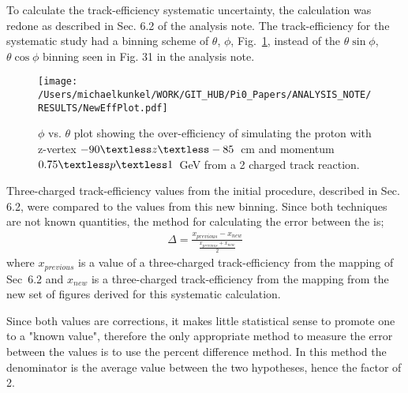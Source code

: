 \documentclass[10pt,a4paper]{report}
\author{Michael C. Kunkel}
\newlength{\figwidth}
\newlength{\hfigheight}
\begin{document}
	To calculate the track-efficiency systematic uncertainty, the calculation was redone as described in Sec. 6.2 of the analysis note. The track-efficiency for the systematic study had a binning scheme of $\theta$, $\phi$, Fig.~\ref{fig:toteff_protnew}, instead of the $\theta \sin\phi$, $\theta \cos\phi$ binning seen in Fig. 31 in the analysis note.
	
\begin{figure}[h!]\begin{center}
		\texttt{[image: /Users/michaelkunkel/WORK/GIT\_HUB/Pi0\_Papers/ANALYSIS\_NOTE/RESULTS/NewEffPlot.pdf]}
		\caption[$\phi$ vs. $\theta$ plot showing the over-efficiency of simulating the proton with z-vertex $-90\textless z\textless-85$~cm and momentum $0.75\textless p \textless 1$~GeV from a 2 charged track reaction]{\label{fig:toteff_protnew} $\phi$ vs. $\theta$ plot showing the over-efficiency of simulating the proton with z-vertex $-90\textless z\textless-85$~cm and momentum $0.75\textless p \textless 1$~GeV from a 2 charged track reaction.}
\end{center}\end{figure}
		
Three-charged track-efficiency values from the initial procedure, described in Sec. 6.2, were compared to the values from this new binning. Since both techniques are not known quantities, the method for calculating the error between the is;
\begin{align}
	\Delta = \frac{x_{previous} -x_{new} }{\frac{x_{previous} +x_{new}}{2}}
\end{align}	
where $x_{previous}$ is a value of a three-charged track-efficiency from the mapping of Sec~6.2 and $x_{new}$ is a three-charged track-efficiency from the mapping from the new set of figures derived for this systematic calculation.

Since both values are corrections, it makes little statistical sense to promote one to a "known value", therefore the only appropriate method to measure the error between the values is to use the percent difference method. In this method the denominator is the average value between the two hypotheses, hence the factor of 2.
\end{document}
